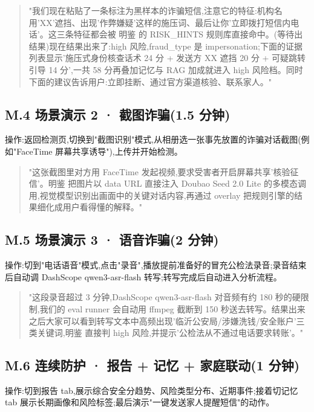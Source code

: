 \documentclass[UTF8,a4paper,12pt]{ctexart}
\begin{document}
\begin{quote}
"我们现在粘贴了一条标注为黑样本的诈骗短信,注意它的特征:机构名用'XX'遮挡、出现'作弊嫌疑'这样的施压词、最后让你'立即拨打短信内电话'。这三条特征都会被 明鉴 的 RISK\_HINTS 规则库直接命中。(等待出结果)现在结果出来了:high 风险,fraud\_type 是 impersonation;下面的证据列表显示'施压式身份核查话术 24 分 + 发送方 XX 遮挡 20 分 + 可疑跳转引导 14 分',一共 58 分再叠加记忆与 RAG 加成就进入 high 风险档。同时下面的建议告诉用户:立即挂断、通过官方渠道核验、联系家人。"
\end{quote}

\subsection*{M.4 场景演示 2 · 截图诈骗(1.5 分钟)}

操作:返回检测页,切换到"截图识别"模式,从相册选一张事先放置的诈骗对话截图(例如"FaceTime 屏幕共享诱导"),上传并开始检测。

\begin{quote}
"这张截图里对方用 FaceTime 发起视频,要求受害者开启屏幕共享'核验征信'。明鉴 把图片以 data URL 直接注入 Doubao Seed 2.0 Lite 的多模态调用,视觉模型识别出画面中的关键对话内容,再通过 overlay 把规则引擎的结果细化成用户看得懂的解释。"
\end{quote}

\subsection*{M.5 场景演示 3 · 语音诈骗(2 分钟)}

操作:切到"电话语音"模式,点击"录音",播放提前准备好的冒充公检法录音;录音结束后自动调 DashScope qwen3-asr-flash 转写;转写完成后自动进入分析流程。

\begin{quote}
"这段录音超过 3 分钟,DashScope qwen3-asr-flash 对音频有约 180 秒的硬限制,我们的 eval runner 会自动用 ffmpeg 截断到 150 秒送去转写。结果出来之后大家可以看到转写文本中高频出现'临沂公安局/涉嫌洗钱/安全账户'三类关键词,明鉴 直接判 high 风险,并提示'公检法从不通过电话要求转账'。"
\end{quote}

\subsection*{M.6 连续防护 · 报告 + 记忆 + 家庭联动(1 分钟)}

操作:切到报告 tab,展示综合安全分趋势、风险类型分布、近期事件;接着切记忆 tab 展示长期画像和风险标签;最后演示"一键发送家人提醒短信"的动作。
\end{document}
